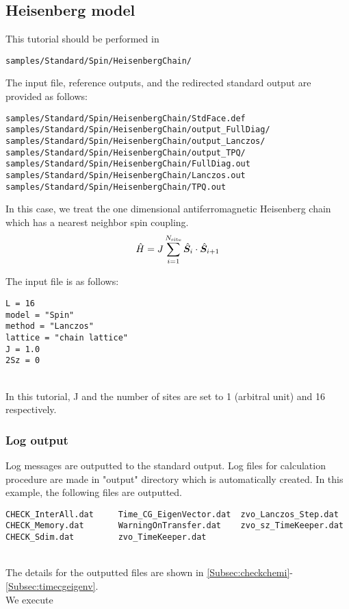 \subsection{Heisenberg model}

This tutorial should be performed in 
\begin{verbatim}
samples/Standard/Spin/HeisenbergChain/
\end{verbatim}

The input file, reference outputs, and the redirected standard output are
provided as follows:
\begin{verbatim}
samples/Standard/Spin/HeisenbergChain/StdFace.def
samples/Standard/Spin/HeisenbergChain/output_FullDiag/
samples/Standard/Spin/HeisenbergChain/output_Lanczos/
samples/Standard/Spin/HeisenbergChain/output_TPQ/
samples/Standard/Spin/HeisenbergChain/FullDiag.out
samples/Standard/Spin/HeisenbergChain/Lanczos.out
samples/Standard/Spin/HeisenbergChain/TPQ.out
\end{verbatim}
%
In this case, we treat the one dimensional antiferromagnetic Heisenberg chain
which has a nearest neighbor spin coupling.
\begin{align}
  {\hat H} = J \sum_{i=1}^{N_{\rm site}} {\hat {\boldsymbol S}}_i \cdot {\hat {\boldsymbol S}}_{i+1}
\end{align}

The input file is as follows:
\\
\begin{minipage}{10cm}
\begin{screen}
\begin{verbatim}
L = 16
model = "Spin"
method = "Lanczos"
lattice = "chain lattice"
J = 1.0
2Sz = 0
\end{verbatim}
\end{screen}
\end{minipage}
%
\\
In this tutorial, J and the number of sites are set to 1 (arbitral unit)
and 16 respectively.

\subsubsection{Log output}
{Log messages are outputted to the standard output.
Log files for calculation procedure are made in "output" directory which is automatically created.
In this example, the following files are outputted.\\}
\begin{minipage}{16cm}
\begin{screen}
\begin{verbatim}
CHECK_InterAll.dat     Time_CG_EigenVector.dat  zvo_Lanczos_Step.dat  
CHECK_Memory.dat       WarningOnTransfer.dat    zvo_sz_TimeKeeper.dat
CHECK_Sdim.dat         zvo_TimeKeeper.dat
\end{verbatim}
\end{screen}
\end{minipage}
\\
{The details for the outputted files are shown in \ref{Subsec:checkchemi}-\ref{Subsec:timecgeigenv}.}
\\
We execute

